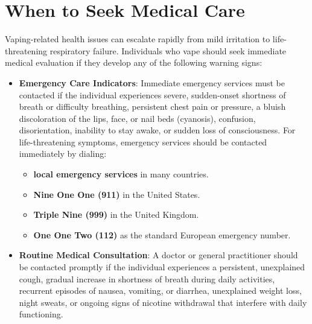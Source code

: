 \section*{When to Seek Medical Care}
Vaping-related health issues can escalate rapidly from mild irritation to life-threatening respiratory failure. Individuals who vape should seek immediate medical evaluation if they develop any of the following warning signs:
\begin{itemize}
    \item \textbf{Emergency Care Indicators}: Immediate emergency services must be contacted if the individual experiences severe, sudden-onset shortness of breath or difficulty breathing, persistent chest pain or pressure, a bluish discoloration of the lips, face, or nail beds (cyanosis), confusion, disorientation, inability to stay awake, or sudden loss of consciousness. For life-threatening symptoms, emergency services should be contacted immediately by dialing:
    \begin{itemize}
        \item \textbf{local emergency services} in many countries.
        \item \textbf{Nine One One (911)} in the United States.
        \item \textbf{Triple Nine (999)} in the United Kingdom.
        \item \textbf{One One Two (112)} as the standard European emergency number.
    \end{itemize}
    \item \textbf{Routine Medical Consultation}: A doctor or general practitioner should be contacted promptly if the individual experiences a persistent, unexplained cough, gradual increase in shortness of breath during daily activities, recurrent episodes of nausea, vomiting, or diarrhea, unexplained weight loss, night sweats, or ongoing signs of nicotine withdrawal that interfere with daily functioning.
\end{itemize}


